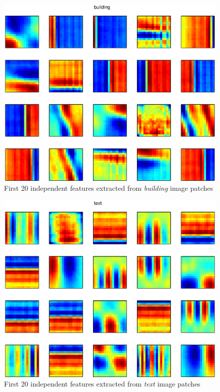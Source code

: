 \documentclass[a4paper,english]{article}
\begin{document}
\begin{figure}[h!]
\centering
\includegraphics[scale = .7]{building_indfeats.eps}
\caption{First 20 independent features extracted from \emph{building} image patches}
\end{figure}

\begin{figure}[h!]
\centering
\includegraphics[scale = .7]{text_indfeats.eps}
\caption{First 20 independent features extracted from \emph{text} image patches}
\end{figure}
\end{document}
